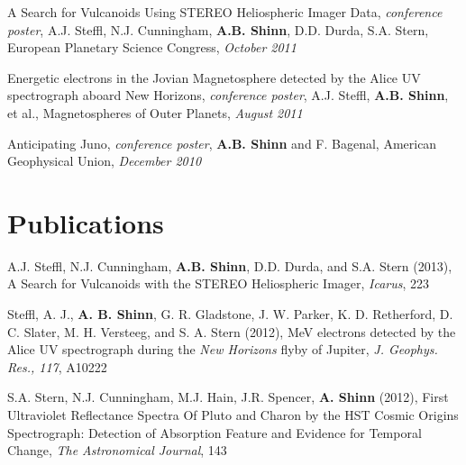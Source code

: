 \documentclass[margin,line]{res}
\newenvironment{list2}{
  \begin{list}{$\cdot$}{%
      \setlength{\itemsep}{0in}
      \setlength{\parsep}{0in} \setlength{\parskip}{0in}
      \setlength{\topsep}{0in} \setlength{\partopsep}{0in} 
      \setlength{\leftmargin}{0.2in}}}{\end{list}}
\begin{document}
\begin{resume}
A Search for Vulcanoids Using STEREO Heliospheric Imager Data, {\it conference poster}, A.J. Steffl, N.J. Cunningham,
{\bf A.B. Shinn}, D.D. Durda, S.A. Stern, European Planetary Science Congress, {\it October 2011}

Energetic electrons in the Jovian Magnetosphere detected by the Alice UV spectrograph aboard New Horizons, {\it conference poster}, A.J. Steffl, {\bf A.B. Shinn}, et al., Magnetospheres of Outer Planets, {\it August 2011}

Anticipating Juno, {\it conference poster}, {\bf A.B. Shinn} and F. Bagenal, American Geophysical Union, {\it December 2010}


\section{\sc Publications}

A.J. Steffl, N.J. Cunningham, {\bf A.B. Shinn}, D.D. Durda, and S.A. Stern (2013), A Search for Vulcanoids with the STEREO Heliospheric Imager, {\em Icarus}, 223

Steffl, A. J., {\bf A. B. Shinn}, G. R. Gladstone, J. W. Parker, K. D. Retherford, D. C. Slater, M. H. Versteeg, and S. A. Stern (2012), MeV electrons detected by the Alice UV spectrograph during the {\em New Horizons} flyby of Jupiter, {\em J. Geophys. Res., 117}, A10222%

S.A. Stern, N.J. Cunningham, M.J. Hain, J.R. Spencer, {\bf A. Shinn} (2012), First Ultraviolet Reflectance Spectra Of Pluto and Charon by the HST Cosmic Origins Spectrograph: Detection of Absorption Feature and Evidence for Temporal Change, {\em The Astronomical Journal}, 143


% 
% 



\end{resume}
\end{document}
